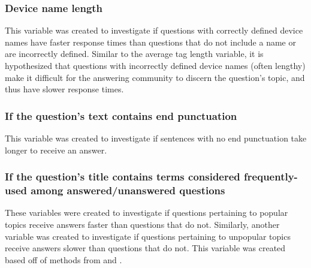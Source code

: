 \documentclass[preprint]{elsarticle}
\begin{document}

\subsubsection{Device name length}

This variable was created to investigate if questions with correctly defined device names have faster response times than questions that do not include a name or are incorrectly defined. Similar to the average tag length variable, it is hypothesized that questions with incorrectly defined device names (often lengthy) make it difficult for the answering community to discern the question's topic, and thus have slower response times. 


\subsubsection{If the question's text contains end punctuation}

This variable was created to investigate if sentences with no end punctuation take longer to receive an answer.


\subsubsection{If the question's title contains terms considered frequently-used among answered/unanswered questions}

These variables were created to investigate if questions pertaining to popular topics receive answers faster than questions that do not. Similarly, another variable was created to investigate if questions pertaining to unpopular topics receive answers slower than questions that do not. This variable was created based off of methods from \cite{Correa2013} and \cite{Ravi2014}.
\end{document}
